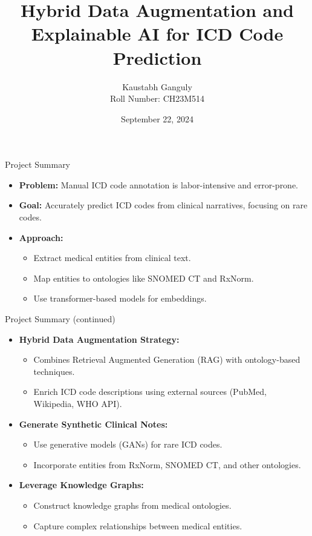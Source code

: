 \documentclass{beamer}
\title[Hybrid Data Augmentation and xAI]{Hybrid Data Augmentation and Explainable AI for ICD Code Prediction}
\author[Kaustabh Ganguly]{Kaustabh Ganguly \\ Roll Number: CH23M514}
\institute{}
\date{September 22, 2024}
\begin{document}
\begin{frame}
    \titlepage
\end{frame}

\begin{frame}{Project Summary}
    \begin{itemize}
        \item \textbf{Problem:} Manual ICD code annotation is labor-intensive and error-prone.
        \item \textbf{Goal:} Accurately predict ICD codes from clinical narratives, focusing on rare codes.
        \item \textbf{Approach:}
        \begin{itemize}
            \item Extract medical entities from clinical text.
            \item Map entities to ontologies like SNOMED CT and RxNorm.
            \item Use transformer-based models for embeddings.
        \end{itemize}
    \end{itemize}
\end{frame}

\begin{frame}{Project Summary (continued)}
    \begin{itemize}
        \item \textbf{Hybrid Data Augmentation Strategy:}
        \begin{itemize}
            \item Combines Retrieval Augmented Generation (RAG) with ontology-based techniques.
            \item Enrich ICD code descriptions using external sources (PubMed, Wikipedia, WHO API).
        \end{itemize}
        \item \textbf{Generate Synthetic Clinical Notes:}
        \begin{itemize}
            \item Use generative models (GANs) for rare ICD codes.
            \item Incorporate entities from RxNorm, SNOMED CT, and other ontologies.
        \end{itemize}
        \item \textbf{Leverage Knowledge Graphs:}
        \begin{itemize}
            \item Construct knowledge graphs from medical ontologies.
            \item Capture complex relationships between medical entities.
        \end{itemize}
    \end{itemize}
\end{frame}
\end{document}
